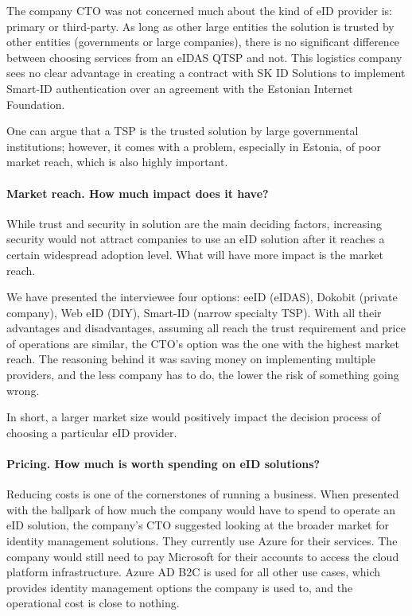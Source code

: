 The company CTO was not concerned much about the kind of eID provider is: primary or third-party. As long as other large entities the solution is trusted by other entities (governments or large companies), there is no significant difference between choosing services from an eIDAS QTSP and not. This logistics company sees no clear advantage in creating a contract with SK ID Solutions to implement Smart-ID authentication over an agreement with the Estonian Internet Foundation.

One can argue that a TSP is the trusted solution by large governmental institutions; however, it comes with a problem, especially in Estonia, of poor market reach, which is also highly important.

\paragraph{Market reach. How much impact does it have?}

While trust and security in solution are the main deciding factors, increasing security would not attract companies to use an eID solution after it reaches a certain widespread adoption level. What will have more impact is the market reach.

We have presented the interviewee four options: eeID (eIDAS), Dokobit (private company), Web eID (DIY), Smart-ID (narrow specialty TSP). With all their advantages and disadvantages, assuming all reach the trust requirement and price of operations are similar, the CTO's option was the one with the highest market reach. The reasoning behind it was saving money on implementing multiple providers, and the less company has to do, the lower the risk of something going wrong.

In short, a larger market size would positively impact the decision process of choosing a particular eID provider.

\paragraph{Pricing. How much is worth spending on eID solutions?}

Reducing costs is one of the cornerstones of running a business. When presented with the ballpark of how much the company would have to spend to operate an eID solution, the company's CTO suggested looking at the broader market for identity management solutions. They currently use Azure for their services. The company would still need to pay Microsoft for their accounts to access the cloud platform infrastructure. Azure AD B2C is used for all other use cases, which provides identity management options the company is used to, and the operational cost is close to nothing.


